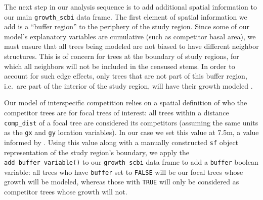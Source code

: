 \documentclass[12pt]{article}
\newenvironment{Shaded}{\begin{snugshade}}{\end{snugshade}}
\newcommand{\CommentTok}[1]{\textcolor[rgb]{0.56,0.35,0.01}{\textit{#1}}}
\newcommand{\DataTypeTok}[1]{\textcolor[rgb]{0.13,0.29,0.53}{#1}}
\newcommand{\DecValTok}[1]{\textcolor[rgb]{0.00,0.00,0.81}{#1}}
\newcommand{\FloatTok}[1]{\textcolor[rgb]{0.00,0.00,0.81}{#1}}
\newcommand{\KeywordTok}[1]{\textcolor[rgb]{0.13,0.29,0.53}{\textbf{#1}}}
\newcommand{\NormalTok}[1]{#1}
\newcommand{\OperatorTok}[1]{\textcolor[rgb]{0.81,0.36,0.00}{\textbf{#1}}}
\newcommand{\StringTok}[1]{\textcolor[rgb]{0.31,0.60,0.02}{#1}}
\begin{document}
The next step in our analysis sequence is to add additional spatial
information to our main \texttt{growth\_scbi} data frame. The first
element of spatial information we add is a ``buffer region'' to the
periphery of the study region. Since some of our model's explanatory
variables are cumulative (such as competitor basal area), we must ensure
that all trees being modeled are not biased to have different neighbor
structures. This is of concern for trees at the boundary of study
regions, for which all neighbors will not be included in the censused
stems. In order to account for such edge effects, only trees that are
not part of this buffer region, i.e.~are part of the interior of the
study region, will have their growth modeled
\citet{waller_applied_2004}.

Our model of interspecific competition relies on a spatial definition of
who the competitor trees are for focal trees of interest: all trees
within a distance \texttt{comp\_dist} of a focal tree are considered its
competitors (assuming the same units as the \texttt{gx} and \texttt{gy}
location variables). In our case we set this value at 7.5m, a value
informed by \citet{canham_neighborhood_2004}
\citet{uriarte_spatially_2004} \citet{canham_neighborhood_2006}. Using
this value along with a manually constructed \texttt{sf} object
representation of the study region's boundary, we apply the
\texttt{add\_buffer\_variable()} to our \texttt{growth\_scbi} data frame
to add a \texttt{buffer} boolean variable: all trees who have
\texttt{buffer} set to \texttt{FALSE} will be our focal trees whose
growth will be modeled, whereas those with \texttt{TRUE} will only be
considered as competitor trees whose growth will not.

\begin{Shaded}
\end{Shaded}
\end{document}
